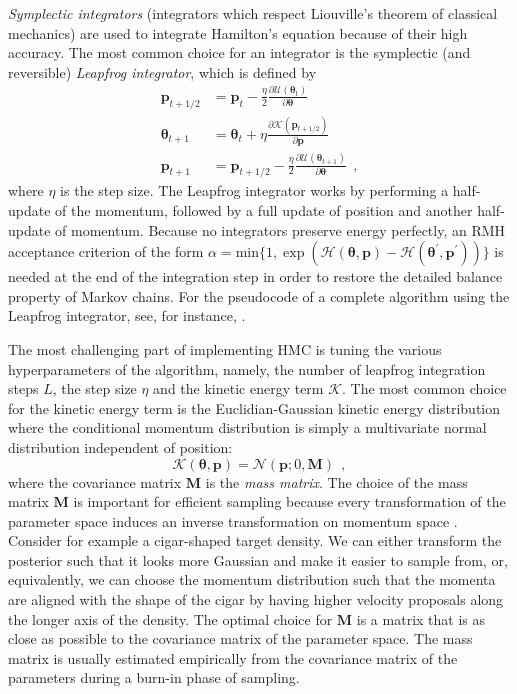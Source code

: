 \documentclass[12pt,dvipsnames]{report}
\renewcommand{\vec}[1]{\boldsymbol{\mathbf{#1}}}
\newcommand{\hquad}{~~}
\begin{document}
\emph{Symplectic integrators} (integrators which respect Liouville's theorem of 
classical mechanics) are used to integrate Hamilton's equation because of their 
high accuracy. The most common choice for an integrator is the symplectic 
(and reversible) \emph{Leapfrog integrator}, which is defined by 
\begin{align}
\vec{p}_{t+1 / 2} &=\vec{p}_{t}-\frac{\eta}{2} \frac{\partial \mathcal{U}\left(\boldsymbol{\theta}_{t}\right)}{\partial \boldsymbol{\theta}} \\
\boldsymbol{\theta}_{t+1} &=\boldsymbol{\theta}_{t}+\eta \frac{\partial \mathcal{K}\left(\boldsymbol{p}_{t+1 / 2}\right)}{\partial \boldsymbol{p}} \\
\vec{p}_{t+1} &=\boldsymbol{p}_{t+1 / 2}-\frac{\eta}{2} \frac{\partial \mathcal{U}\left(\boldsymbol{\theta}_{t+1}\right)}{\partial \boldsymbol{\theta}}
\hquad,
\end{align}
where $\eta$ is the step size. The Leapfrog integrator works by performing a
half-update of the momentum, followed by a full update of position and another half-update 
of momentum.
Because no integrators  preserve energy perfectly, an RMH acceptance criterion of the form 
$\alpha=\mathrm{min}\{1,\exp (\mathcal{H}(\boldsymbol{\theta}, \mathbf p) -\mathcal{H}(\boldsymbol{\theta}^\prime, \vec p^\prime))\}$ 
is needed at the end of the integration step in order to restore the detailed balance 
property of Markov chains.
For the pseudocode of a complete algorithm using the Leapfrog integrator, see, 
for instance, \citet{murphy_book_2023}.


The most challenging part of implementing HMC is tuning the various hyperparameters of 
the algorithm, namely, the number of leapfrog integration steps $L$, the step size
$\eta$ and the kinetic energy term $\mathcal{K}$.
The most common choice for the kinetic energy term is the Euclidian-Gaussian kinetic 
energy distribution where  the conditional momentum distribution is simply a 
multivariate normal distribution independent of position:
\begin{equation}
\mathcal{K}(\vec\theta, \vec p) = \mathcal{N}(\mathbf p ; 0, \mathbf M)
\hquad,
\end{equation}
where the covariance matrix $\mathbf M$ is the \emph{mass matrix}.
The choice of the mass matrix $\mathbf{M}$ is important for efficient sampling because 
every transformation of the parameter space induces an inverse transformation on 
momentum space \citep{arXiv:1701.02434}. Consider for example a cigar-shaped target 
density.
We can either transform the posterior such that it looks more Gaussian and make it
 easier to sample from, or, equivalently, we can choose the momentum distribution such 
 that the momenta are aligned with the shape of the cigar by having higher velocity 
 proposals along the longer axis of the density.
The optimal choice for $\mathbf{M}$ is a matrix that is as close as 
possible to the covariance matrix of the parameter space.
The mass matrix is usually estimated empirically from the covariance matrix of the 
parameters during a burn-in phase of sampling. 
\end{document}

